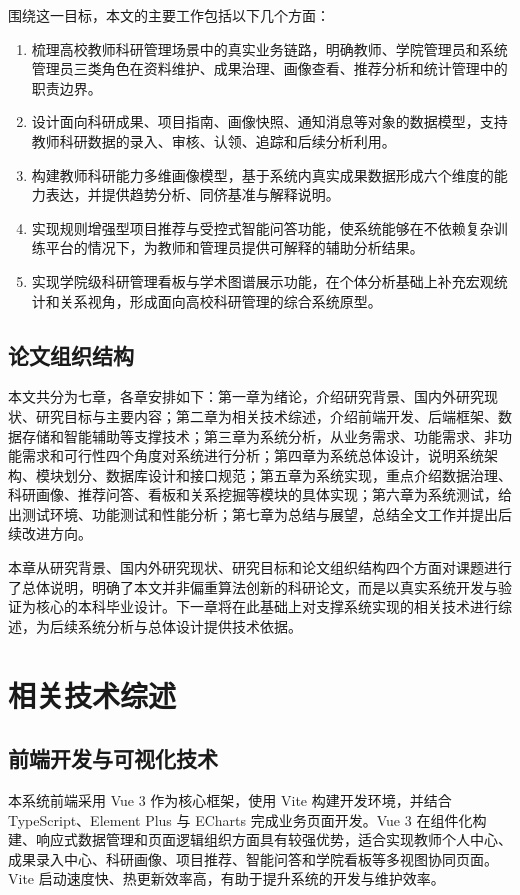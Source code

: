 \documentclass[12pt,a4paper]{ctexbook}
\begin{document}
围绕这一目标，本文的主要工作包括以下几个方面：
\begin{enumerate}
  \item 梳理高校教师科研管理场景中的真实业务链路，明确教师、学院管理员和系统管理员三类角色在资料维护、成果治理、画像查看、推荐分析和统计管理中的职责边界。
  \item 设计面向科研成果、项目指南、画像快照、通知消息等对象的数据模型，支持教师科研数据的录入、审核、认领、追踪和后续分析利用。
  \item 构建教师科研能力多维画像模型，基于系统内真实成果数据形成六个维度的能力表达，并提供趋势分析、同侪基准与解释说明。
  \item 实现规则增强型项目推荐与受控式智能问答功能，使系统能够在不依赖复杂训练平台的情况下，为教师和管理员提供可解释的辅助分析结果。
  \item 实现学院级科研管理看板与学术图谱展示功能，在个体分析基础上补充宏观统计和关系视角，形成面向高校科研管理的综合系统原型。
\end{enumerate}

\section{论文组织结构}
本文共分为七章，各章安排如下：第一章为绪论，介绍研究背景、国内外研究现状、研究目标与主要内容；第二章为相关技术综述，介绍前端开发、后端框架、数据存储和智能辅助等支撑技术；第三章为系统分析，从业务需求、功能需求、非功能需求和可行性四个角度对系统进行分析；第四章为系统总体设计，说明系统架构、模块划分、数据库设计和接口规范；第五章为系统实现，重点介绍数据治理、科研画像、推荐问答、看板和关系挖掘等模块的具体实现；第六章为系统测试，给出测试环境、功能测试和性能分析；第七章为总结与展望，总结全文工作并提出后续改进方向。

本章从研究背景、国内外研究现状、研究目标和论文组织结构四个方面对课题进行了总体说明，明确了本文并非偏重算法创新的科研论文，而是以真实系统开发与验证为核心的本科毕业设计。下一章将在此基础上对支撑系统实现的相关技术进行综述，为后续系统分析与总体设计提供技术依据。

\chapter{相关技术综述}
\section{前端开发与可视化技术}
本系统前端采用 Vue 3 作为核心框架，使用 Vite 构建开发环境，并结合 TypeScript、Element Plus 与 ECharts 完成业务页面开发。Vue 3 在组件化构建、响应式数据管理和页面逻辑组织方面具有较强优势，适合实现教师个人中心、成果录入中心、科研画像、项目推荐、智能问答和学院看板等多视图协同页面。Vite 启动速度快、热更新效率高，有助于提升系统的开发与维护效率。
\end{document}
